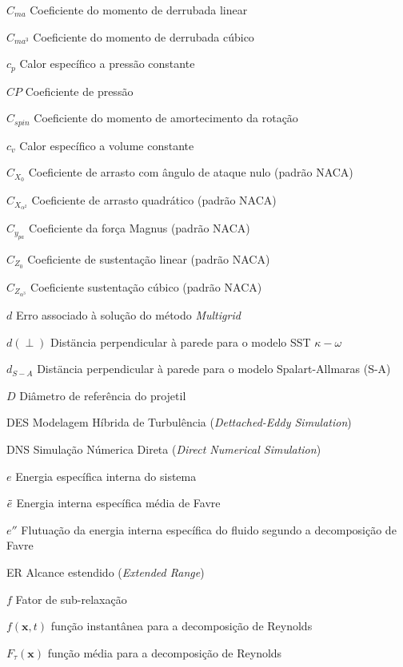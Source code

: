 \begin{siglas}
    \item[\(C_{ma}\)] Coeficiente do momento de derrubada linear
    \item[\(C_{ma^3}\)] Coeficiente do momento de derrubada cúbico
    \item[\(c_p\)] Calor específico a pressão constante
    \item[\(CP\)] Coeficiente de pressão
    \item[\(C_{spin}\)] Coeficiente do momento de amortecimento da rotação
    \item[\(c_v\)] Calor específico a volume constante
    \item[\(C_{X_0}\)] Coeficiente de arrasto com ângulo de ataque nulo (padrão NACA)
    \item[\(C_{X_{\alpha^2}}\)] Coeficiente de arrasto quadrático (padrão NACA)
    \item[\(C_{y_{pa}}\)] Coeficiente da força Magnus (padrão NACA)
    \item[\(C_{Z_0}\)] Coeficiente de sustentação linear (padrão NACA)
    \item[\(C_{Z_{\alpha^3}}\)] Coeficiente sustentação cúbico (padrão NACA)
    \item[\(d\)] Erro associado à solução do método \textit{Multigrid}
    \item[\(d(\perp)\)] Distäncia perpendicular à parede para o modelo SST \(\kappa-\omega\)
    \item[\(d_{S-A}\)] Distäncia perpendicular à parede para o modelo Spalart-Allmaras (S-A)
    \item[\(D\)] Diâmetro de referência do projetil
    \item[DES] Modelagem Híbrida de Turbulência (\textit{Dettached-Eddy Simulation})
    \item[DNS] Simulação Númerica Direta (\textit{Direct Numerical Simulation})
    \item[\(e\)] Energia específica interna do sistema
    \item[\(\Tilde{e}\)] Energia interna específica média de Favre
    \item[\(e''\)] Flutuação da energia interna específica do fluido segundo a decomposição de Favre
    \item[ER] Alcance estendido (\textit{Extended Range})
    \item[\(f\)] Fator de sub-relaxação
    \item[\(f(\textbf{x},t)\)] função instantânea para a decomposição de Reynolds
    \item[\(F_{\tau}(\textbf{x})\)] função média para a decomposição de Reynolds

\end{siglas}
